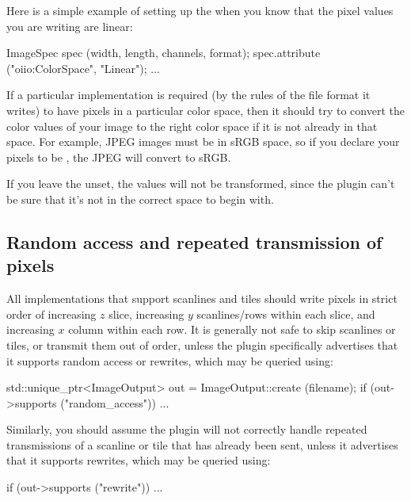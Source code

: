 Here is a simple example of setting up the \ImageSpec
when you know that the pixel values you are writing are linear:

\begin{code}
        ImageSpec spec (width, length, channels, format);
        spec.attribute ("oiio:ColorSpace", "Linear");
        ...
\end{code}

If a particular \ImageOutput implementation is required (by the rules of
the file format it writes) to have pixels in a particular color space,
then it should try to convert the color values of your image to the right color
space if it is not already in that space.  For example, JPEG images
must be in sRGB space, so if you declare your pixels to be ,
the JPEG \ImageOutput will convert to sRGB.

If you leave the  unset, the values will not be
transformed, since the plugin can't be sure that it's not in the correct
space to begin with.



\subsection{Random access and repeated transmission of pixels}
\label{sec:imageoutput:randomrewrite}

All \ImageOutput implementations that support scanlines and tiles should write pixels in strict
order of increasing $z$ slice, increasing $y$ scanlines/rows within each
slice, and increasing $x$ column within each row.  It is generally not
safe to skip scanlines or tiles, or transmit them out of order, unless
the plugin specifically advertises that it supports random access or
rewrites, which may be queried using:

\begin{code}
        std::unique_ptr<ImageOutput> out = ImageOutput::create (filename);
        if (out->supports ("random_access"))
            ...
\end{code}

\noindent Similarly, you should assume the plugin will not correctly
handle repeated transmissions of a scanline or tile that has already
been sent, unless it advertises that it supports rewrites, which may be
queried using:

\begin{code}
        if (out->supports ("rewrite"))
            ...
\end{code}


